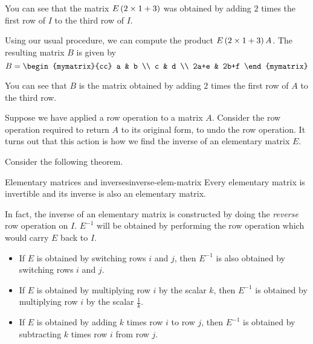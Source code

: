 \begin{solution}
You can see that the matrix $E\left(2 \times 1+3\right)$ was obtained by adding $2$ times the first row
of $I$ to the third row of $I$. 

Using our usual procedure, we can compute the product $E\left(2 \times 1+3\right)A$. The resulting 
matrix $B$ is given by 
\begin{equation*}
B = \begin{mymatrix}{cc}
a & b \\
c & d \\
2a+e & 2b+f
\end{mymatrix}
\end{equation*}

You can see that $B$ is the matrix obtained by adding $2$ times the first row of $A$ to the third row. 
\end{solution}

Suppose we have applied a row operation to a matrix $A$. Consider the row operation required to return $A$ to its original form, to undo
the row operation. It turns out that this action is how we find the inverse of an elementary matrix $E$. 

Consider the following theorem.

\begin{theorem}{Elementary matrices and inverses}{inverse-elem-matrix}
Every elementary matrix is invertible and its inverse is also an elementary matrix.
\end{theorem}

In fact, the inverse of an elementary matrix is constructed by doing the {\em reverse \em}row operation on $I$. $E^{-1}$ will
be obtained by performing the row operation which would carry $E$ back to $I$. 

\begin{itemize}
\item If $E$ is obtained by switching rows $i$ and $j$, then $E^{-1}$ is also obtained by switching rows $i$ and $j$. 

\item If $E$ is obtained by multiplying row $i$ by the scalar $k$, then $E^{-1}$ is obtained by multiplying row $i$ by
the scalar $\frac{1}{k}$. 

\item If $E$ is obtained by adding $k$ times row $i$ to row $j$, then $E^{-1}$ is obtained by 
subtracting $k$ times row $i$ from row $j$.
\end{itemize} 

